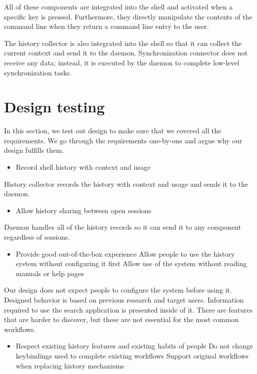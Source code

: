 All of these components are integrated into the shell and activated when a specific key is pressed. Furthermore, they directly manipulate the contents of the command line when they return a command line entry to the user.

The history collector is also integrated into the shell so that it can collect the current context and send it to the daemon. Synchronization connector does not receive any data; instead, it is executed by the daemon to complete low-level synchronization tasks. 

\section{Design testing}

In this section, we test out design to make sure that we covered all the requirements. We go through the requirements one-by-one and argue why our design fulfills them. 

\begin{itemize}
\item Record shell history with context and usage
\end{itemize}

History collector records the history with context and usage and sends it to the daemon.

\begin{itemize}
\item Allow history sharing between open sessions
\end{itemize}

Daemon handles all of the history records so it can send it to any component regardless of sessions.

\begin{itemize}
\item Provide good out-of-the-box experience 
\subitem Allow people to use the history system without configuring it first
\subitem Allow use of the system without reading manuals or help pages
\end{itemize}

Our design does not expect people to configure the system before using it. Designed behavior is based on previous research and target users. Information required to use the search application is presented inside of it. There are features that are harder to discover, but these are not essential for the most common workflows. 

\begin{itemize}
\item Respect existing history features and existing habits of people
\subitem Do not change keybindings used to complete existing workflows
\subitem Support original workflows when replacing history mechanisms
\end{itemize}

